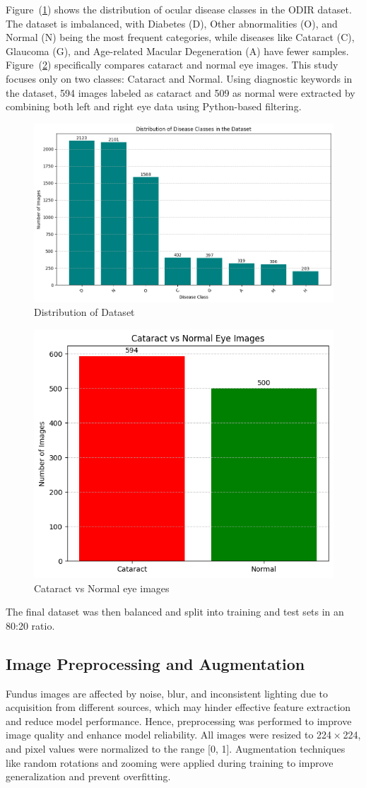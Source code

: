 \documentclass{ijclclp}
\begin{document}
Figure~(\ref{fig:datadistr}) shows the distribution of ocular disease classes in the ODIR dataset. The dataset is imbalanced, with Diabetes (D), Other abnormalities (O), and Normal (N) being the most frequent categories, while diseases like Cataract (C), Glaucoma (G), and Age-related Macular Degeneration (A) have fewer samples. Figure~(\ref{fig:cvn}) specifically compares cataract and normal eye images. This study focuses only on two classes: Cataract and Normal. Using diagnostic keywords in the dataset, 594 images labeled as cataract and 509 as normal were extracted by combining both left and right eye data using Python-based filtering.
\begin{figure}
    \centering
    \includegraphics[width=0.7\linewidth]{image1.png}
    \caption{Distribution of Dataset}
    \label{fig:datadistr}
\end{figure}
\begin{figure}[ht]
    \centering
    \includegraphics[width=0.6\linewidth]{image2.png}
    \caption{Cataract vs Normal eye images}
    \label{fig:cvn}
\end{figure}

The final dataset was then balanced and split into training and test sets in an 80:20 ratio.

\subsection{Image Preprocessing and Augmentation}
\vspace{1em}
Fundus images are affected by noise, blur, and inconsistent lighting due to acquisition from different sources, which may hinder effective feature extraction and reduce model performance. Hence, preprocessing was performed to improve image quality and enhance model reliability. All images were resized to 224 × 224, and pixel values were normalized to the range [0, 1]. Augmentation techniques like random rotations and zooming were applied during training to improve generalization and prevent overfitting.
\end{document}

